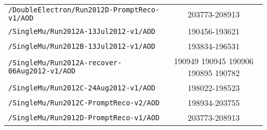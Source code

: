 \begin{table}[!hbt]
{\begin{minipage}{\textwidth}
\begin{tabular}{lc}
{\tt /DoubleElectron/Run2012D-PromptReco-v1/AOD       } & 203773-208913                      \\ 
{\tt /SingleMu/Run2012A-13Jul2012-v1/AOD              } & 190456-193621                      \\ 
{\tt /SingleMu/Run2012B-13Jul2012-v1/AOD              } & 193834-196531                      \\ 
{\tt /SingleMu/Run2012A-recover-06Aug2012-v1/AOD      } & 190949 190945 190906 190895 190782 \\ 
{\tt /SingleMu/Run2012C-24Aug2012-v1/AOD              } & 198022-198523                      \\ 
{\tt /SingleMu/Run2012C-PromptReco-v2/AOD             } & 198934-203755                      \\ 
{\tt /SingleMu/Run2012D-PromptReco-v1/AOD             } & 203773-208913                      \\ 
\hline\hline
\end{tabular}
\end{minipage}
}
\end{table}
